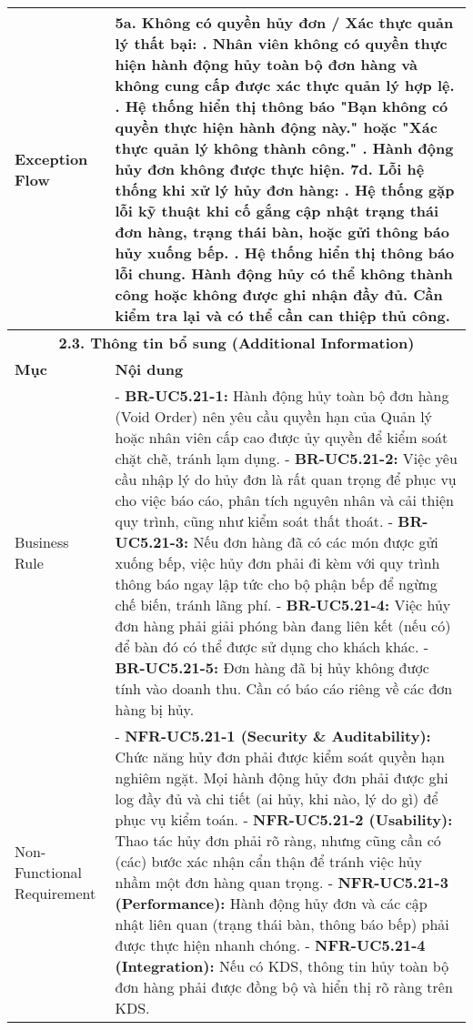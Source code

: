 \begin{longtable}{|m{4cm}|p{11cm}|}
Exception Flow & \textbf{5a. Không có quyền hủy đơn / Xác thực quản lý thất bại:} \newline    1. Nhân viên không có quyền thực hiện hành động hủy toàn bộ đơn hàng và không cung cấp được xác thực quản lý hợp lệ. \newline    2. Hệ thống hiển thị thông báo "Bạn không có quyền thực hiện hành động này." hoặc "Xác thực quản lý không thành công." \newline    3. Hành động hủy đơn không được thực hiện. \newline \textbf{7d. Lỗi hệ thống khi xử lý hủy đơn hàng:} \newline    1. Hệ thống gặp lỗi kỹ thuật khi cố gắng cập nhật trạng thái đơn hàng, trạng thái bàn, hoặc gửi thông báo hủy xuống bếp. \newline    2. Hệ thống hiển thị thông báo lỗi chung. Hành động hủy có thể không thành công hoặc không được ghi nhận đầy đủ. Cần kiểm tra lại và có thể cần can thiệp thủ công. \\
\hline
\multicolumn{2}{|c|}{\textbf{2.3. Thông tin bổ sung (Additional Information)}} \\
\hline
\textbf{Mục} & \textbf{Nội dung} \\
\hline
Business Rule & - \textbf{BR-UC5.21-1:} Hành động hủy toàn bộ đơn hàng (Void Order) nên yêu cầu quyền hạn của Quản lý hoặc nhân viên cấp cao được ủy quyền để kiểm soát chặt chẽ, tránh lạm dụng. \newline - \textbf{BR-UC5.21-2:} Việc yêu cầu nhập lý do hủy đơn là rất quan trọng để phục vụ cho việc báo cáo, phân tích nguyên nhân và cải thiện quy trình, cũng như kiểm soát thất thoát. \newline - \textbf{BR-UC5.21-3:} Nếu đơn hàng đã có các món được gửi xuống bếp, việc hủy đơn phải đi kèm với quy trình thông báo ngay lập tức cho bộ phận bếp để ngừng chế biến, tránh lãng phí. \newline - \textbf{BR-UC5.21-4:} Việc hủy đơn hàng phải giải phóng bàn đang liên kết (nếu có) để bàn đó có thể được sử dụng cho khách khác. \newline - \textbf{BR-UC5.21-5:} Đơn hàng đã bị hủy không được tính vào doanh thu. Cần có báo cáo riêng về các đơn hàng bị hủy. \\
\hline
Non-Functional Requirement & - \textbf{NFR-UC5.21-1 (Security \& Auditability):} Chức năng hủy đơn phải được kiểm soát quyền hạn nghiêm ngặt. Mọi hành động hủy đơn phải được ghi log đầy đủ và chi tiết (ai hủy, khi nào, lý do gì) để phục vụ kiểm toán. \newline - \textbf{NFR-UC5.21-2 (Usability):} Thao tác hủy đơn phải rõ ràng, nhưng cũng cần có (các) bước xác nhận cẩn thận để tránh việc hủy nhầm một đơn hàng quan trọng. \newline - \textbf{NFR-UC5.21-3 (Performance):} Hành động hủy đơn và các cập nhật liên quan (trạng thái bàn, thông báo bếp) phải được thực hiện nhanh chóng. \newline - \textbf{NFR-UC5.21-4 (Integration):} Nếu có KDS, thông tin hủy toàn bộ đơn hàng phải được đồng bộ và hiển thị rõ ràng trên KDS. \\
\hline
\end{longtable}

